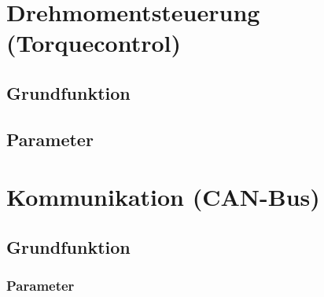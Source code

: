 \section{Drehmomentsteuerung (Torquecontrol)}
\subsection{Grundfunktion}
\subsection{Parameter}

\section{Kommunikation (CAN-Bus)}
\subsection{Grundfunktion}
\subsubsection{Parameter}
